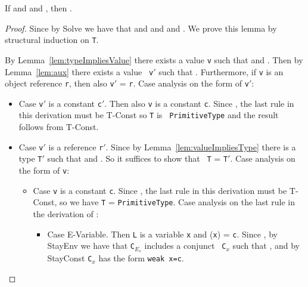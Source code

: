 \begin{Lemma}
\label{lem:keyAux}
 If \emph{} and
 \emph{}  and
\emph{}, then
  \emph{}. 
\end{Lemma}
\begin{proof}
Since  by
{\sc Solve} we have that 
     and
     and
     and
    .
We prove this lemma by structural induction on {\tt T}.  

By Lemma~\ref{lem:typeImpliesValue} there exists a value {\tt v}
such that  and .
Then by Lemma~\ref{lem:aux} there exists a value {\tt
  v$'$} such that
  .  Furthermore, if {\tt v}
  is an object reference {\tt r}, then also {\tt v$'$} = {\tt r}.
  Case analysis on the form of {\tt v$'$}:
 \begin{itemize}
\item Case {\tt v$'$} is a constant {\tt c$'$}.  Then also {\tt v} is
  a constant {\tt c}.  Since , the last rule
  in this derivation must be {\sc T-Const} so {\tt T} is {\tt
    PrimitiveType} and the result follows from {\sc T-Const}.
  \item Case {\tt v$'$} is a reference {\tt r$'$}.  Since 
 by 
  Lemma~\ref{lem:valueImpliesType} there is a type {\tt T$'$} such
  that
     and
  .   
So it suffices to show that {\tt
    T} = {\tt T$'$}.  Case analysis on the form of
  {\tt v}:
\begin{itemize}
\item Case {\tt v} is a constant {\tt c}.  Since , the
    last rule in this derivation must be {\sc T-Const}, so 
   we have {\tt T} = {\tt PrimitiveType}.  Case analysis on the last
   rule in the derivation of :
  \begin{itemize}
  \item Case {\sc E-Variable}.  Then {\tt L} is a variable {\tt x} and
  \Euid({\tt x}) = {\tt c}.  Since , by
  {\sc StayEnv} we have that {\tt C$_{E_s}$} includes a conjunct {\tt
    C$_x$} such that , and by {\sc
    StayConst}
{\tt C$_x$} has the form {\tt weak x=c}.  


\end{itemize}
\end{itemize}
\end{itemize}
\end{proof}
